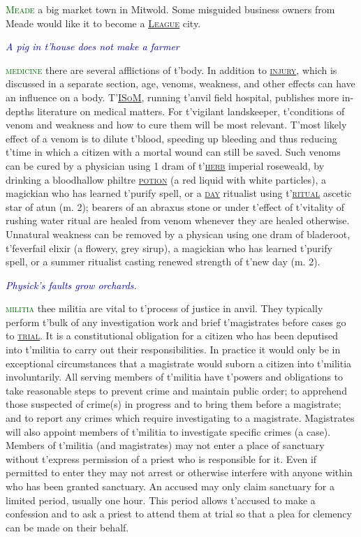 \documentclass[twoside,11pt,b5paper,twocolumn]{scrbook}
\newcommand{\estcab}[1]{\textsc{\textcolor{marron}{#1}}}
\renewcommand{\paragraph}[1]{\par\noindent\markboth{#1}{#1}\estcab{\textcolor{darkgreen}{#1}}\label{#1} }
\newcommand{\see}[1]{{\estcab{\hyperref[#1]{#1}}}}
\newcommand{\proverb}[1]{\par \textcolor{darkblue}{\itshape #1}}
\begin{document}
\paragraph{Meade} a big market town in Mitwold. Some misguided business owners from Meade would like it to become a \see{League} city. \proverb{A pig in t'house does not make a farmer}
\paragraph{medicine} there are several afflictions of t'body. In addition to \see{injury}, which is discussed in a separate section, age, venoms, weakness, and other effects can have an influence on a body. T'\see{ISoM}, running t'anvil field hospital, publishes more in-depths literature on medical matters. For t'vigilant landskeeper, t'conditions of venom and weakness and how to cure them will be most relevant. T'most likely effect of a venom is to dilute t'blood, speeding up bleeding and thus reducing t'time in which a citizen with a mortal wound can still be saved. Such venoms can be cured by a physician using 1 dram of t'\see{herb} imperial roseweald, by drinking a bloodhallow philtre \see{potion} (a red liquid with white particles), a magickian who has learned t'purify spell, or a \see{day} ritualist using t'\see{ritual} ascetic star of atun (m. 2); bearers of an abraxus stone or under t'effect of t'vitality of rushing water ritual are healed from venom whenever they are healed otherwise. Unnatural weakness can be removed by a physican using one dram of bladeroot, t'feverfail elixir (a flowery, grey sirup), a magickian who has learned t'purify spell, or a summer ritualist casting renewed strength of t'new day (m. 2). \proverb{Physick's faults grow orchards.}
\paragraph{militia} thee militia are vital to t'process of justice in anvil. They typically perform t'bulk of any investigation work and brief t'magistrates before cases go to \see{trial}. It is a constitutional obligation for a citizen who has been deputised into t'militia to carry out their responsibilities. In practice it would only be in exceptional circumstances that a magistrate would suborn a citizen into t'militia involuntarily. All serving members of t'militia have t'powers and obligations to take reasonable steps to prevent crime and maintain public order; to apprehend those suspected of crime(s) in progress and to bring them before a magistrate; and to report any crimes which require investigating to a magistrate. Magistrates will also appoint members of t'militia to investigate specific crimes (a case). Members of t'militia (and magistrates) may not enter a place of sanctuary without t'express permission of a priest who is responsible for it. Even if permitted to enter they may not arrest or otherwise interfere with anyone within who has been granted sanctuary. An accused may only claim sanctuary for a limited period, usually one hour. This period allows t'accused to make a confession and to ask a priest to attend them at trial so that a plea for clemency can be made on their behalf.
\end{document}
